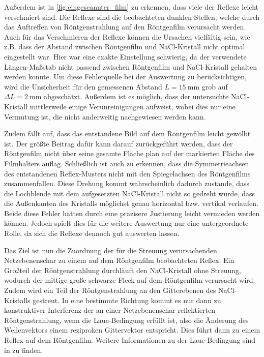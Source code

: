 Außerdem ist in \cref{fig:eingescannter_film} zu erkennen, dass viele der Reflexe leicht verschmiert sind. Die Reflexe sind die beobachteten dunklen Stellen, welche durch das
Auftreffen von Röntgenstrahlung auf den Röntgenfilm verursacht werden. Auch für das Verschmieren der Reflexe können die Ursachen vielfältig sein, wie z.B.
dass der Abstand zwischen Röntgenfilm und NaCl-Kristall nicht optimal eingestellt war. Hier war eine exakte Einstellung schwierig, da der verwendete Längen-Maßstab
nicht passend zwischen Röntgenfilm und NaCl-Kristall gehalten werden konnte. Um diese Fehlerquelle bei der Auswertung zu berücksichtigen, wird die Unsicherheit
für den gemessenen Abstand $L = \SI{15}{\milli \meter}$ grob auf $\Delta L = \SI{2}{\milli \meter}$ abgeschätzt. Außerdem ist es möglich, dass der untersuchte NaCl-Kristall mittlerweile einige Verunreinigungen
aufweist, wobei dies nur eine Vermutung ist, die nicht anderweitig nachgewiesen werden kann.\par
Zudem fällt auf, dass das entstandene Bild auf dem Röntgenfilm leicht gewölbt ist. Der größte Beitrag dafür kann darauf zurückgeführt werden, dass der Röntgenfilm
nicht über seine gesamte Fläche plan auf der markierten Fläche des Filmhalters auflag. Schließlich ist auch zu erkennen, dass die Symmetrieachsen des entstandenen Reflex-Musters
nicht mit den Spiegelachsen des Röntgenfilms zusammenfallen. Diese Drehung kommt wahrscheinlich dadurch zustande, dass die Lochblende mit dem aufgesetzten NaCl-Kristall nicht so gedreht wurde,
dass die Außenkanten des Kristalls möglichst genau horizontal bzw. vertikal verlaufen. Beide diese Fehler hätten durch eine präzisere Justierung leicht vermieden werden können. Jedoch spielt dies für die
weitere Auswertung nur eine untergeordnete Rolle, da sich die Reflexe dennoch gut auswerten lassen.\\ \par
Das Ziel ist nun die Zuordnung der für die Streuung verursachenden Netzebenenschar zu einem auf dem Röntgenfilm beobachteten Reflex. Ein Großteil der Röntgenstrahlung
durchläuft den NaCl-Kristall ohne Streuung, wodurch der mittige große schwarze Fleck auf dem Röntgenfilm verursacht wird. Zudem wird ein Teil der Röntgenstrahlung
an den Gitterebenen des NaCl-Kristalls gestreut. In eine bestimmte Richtung kommt es nur dann zu konstruktiver Interferenz der an einer Netzebenenschar reflektierten
Röntgenstrahlung, wenn die Laue-Bedingung erfüllt ist, also die Änderung des Wellenvektors einem reziproken Gittervektor entspricht. Dies führt dann zu einem
Reflex auf dem Röntgenfilm. Weitere Informationen zu der Laue-Bedingung sind in \cite{kristalle} zu finden.\par
